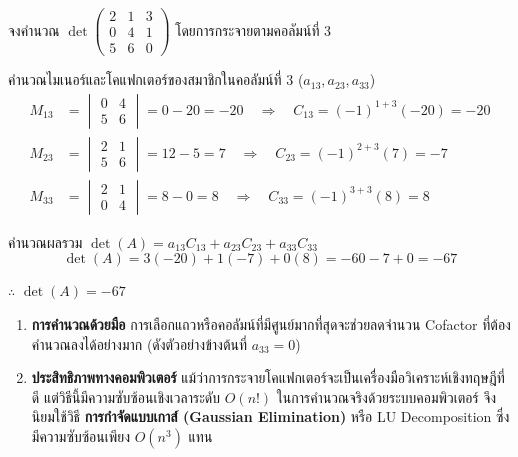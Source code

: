 \begin{ex}
\label{ex:det-choose-row}
จงคำนวณ $\det\begin{pmatrix} 2 & 1 & 3 \\ 0 & 4 & 1 \\ 5 & 6 & 0 \end{pmatrix}$ โดยการกระจายตามคอลัมน์ที่ 3
\end{ex}
\begin{solution}
คำนวณไมเนอร์และโคแฟกเตอร์ของสมาชิกในคอลัมน์ที่ 3 ($a_{13}, a_{23}, a_{33}$) \begin{align*}
    M_{13} &= \begin{vmatrix} 0 & 4 \\ 5 & 6 \end{vmatrix} = 0 - 20 = -20 \quad \Rightarrow \quad C_{13} = (-1)^{1+3}(-20) = -20\\
    M_{23} &= \begin{vmatrix} 2 & 1 \\ 5 & 6 \end{vmatrix} = 12 - 5 = 7 \quad \Rightarrow \quad C_{23} = (-1)^{2+3}(7) = -7\\
    M_{33} &= \begin{vmatrix} 2 & 1 \\ 0 & 4 \end{vmatrix} = 8 - 0 = 8 \quad \Rightarrow \quad C_{33} = (-1)^{3+3}(8) = 8
    \end{align*}

คำนวณผลรวม $\det(A) = a_{13}C_{13} + a_{23}C_{23} + a_{33}C_{33}$ \[ \det(A) = 3(-20) + 1(-7) + 0(8) = -60 - 7 + 0 = -67 \]

$\therefore$ $\det(A) = -67$ \solhere
\end{solution}

\begin{rem}
\begin{enumerate}
    \item \textbf{การคำนวณด้วยมือ} การเลือกแถวหรือคอลัมน์ที่มีศูนย์มากที่สุดจะช่วยลดจำนวน Cofactor ที่ต้องคำนวณลงได้อย่างมาก (ดังตัวอย่างข้างต้นที่ $a_{33} = 0$)
    \item \textbf{ประสิทธิภาพทางคอมพิวเตอร์} แม้ว่าการกระจายโคแฟกเตอร์จะเป็นเครื่องมือวิเคราะห์เชิงทฤษฎีที่ดี แต่วิธีนี้มีความซับซ้อนเชิงเวลาระดับ $O(n!)$ ในการคำนวณจริงด้วยระบบคอมพิวเตอร์ จึงนิยมใช้วิธี \textbf{การกำจัดแบบเกาส์ (Gaussian Elimination)} หรือ LU Decomposition ซึ่งมีความซับซ้อนเพียง $O(n^3)$ แทน
\end{enumerate}
\end{rem}

